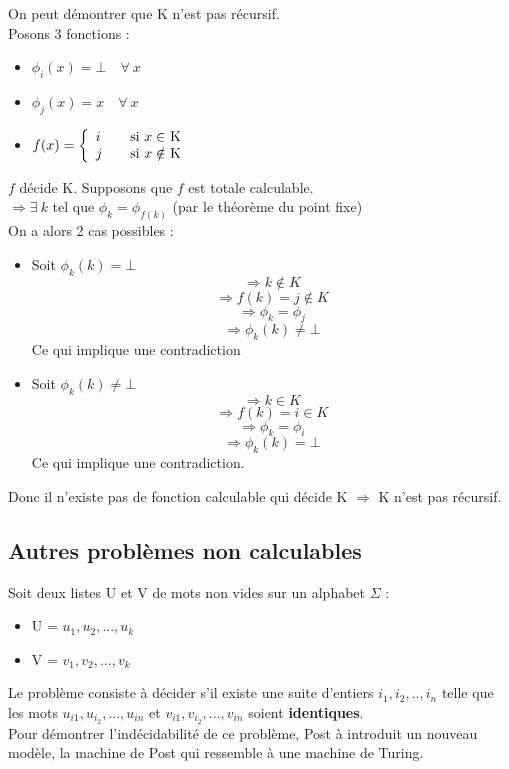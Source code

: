 \begin{myrem}
	On peut démontrer que K n'est pas récursif.\\
	Posons 3 fonctions :
	\begin{itemize}
		\item $\phi_i(x) = \bot \quad \forall \ x$
		\item $\phi_j(x) = x \quad \forall  \ x$
		\item $ f(x) = \left\{
		\begin{array}{l l}
			i & \quad \text{si $x\in$ K}\\
    		j & \quad \text{si $x\notin$ K}
		\end{array} \right.$
	\end{itemize}
	$f$ décide K. Supposons que $f$ est totale calculable. \\
	$ \Rightarrow \exists \ k$ tel que $\phi_k = \phi_{f(k)}$ (par le théorème
du point fixe)\\
	On a alors 2 cas possibles :
	\begin{itemize}
		\item Soit $\phi_k(k)=\bot$
			\[ \Rightarrow k \notin K\]
			\[ \Rightarrow f(k)=j \notin K\]
			\[ \Rightarrow \phi_k = \phi_j \]
			\[ \Rightarrow \phi_k(k) \neq \bot\]
			Ce qui implique une contradiction
		\item Soit $\phi_k(k) \neq \bot$
			\[ \Rightarrow k \in K\]
			\[ \Rightarrow f(k)=i \in K\]
			\[ \Rightarrow \phi_k = \phi_i \]
			\[ \Rightarrow \phi_k(k) = \bot\]
			Ce qui implique une contradiction.
	\end{itemize}
	Donc il n'existe pas de fonction calculable qui décide K $ \Rightarrow$ K n'est pas récursif.
\end{myrem}

\subsection{Autres problèmes non calculables}
\label{sub:autres_probl_mes_non_calculable}

\begin{mydef} Soit deux listes U et V 
	de mots non vides sur un alphabet $\Sigma$ : 
	\begin{itemize}
		\item U = ${u_1,u_2,...,u_k}$
		\item V = ${v_1,v_2,...,v_k}$
	\end{itemize}
	Le problème consiste à décider s’il existe une suite d'entiers 
	$i_1,i_2,..,i_n$ telle que les mots $u_{i1},u_{i_2},...,u_{in}$ et 
	$v_{i1},v_{i_2},...,v_{in}$ soient \textbf{identiques}. \\
	Pour démontrer l'indécidabilité de ce problème, Post à introduit un 
	nouveau modèle, la machine de Post qui ressemble à une machine de Turing.
\end{mydef}

